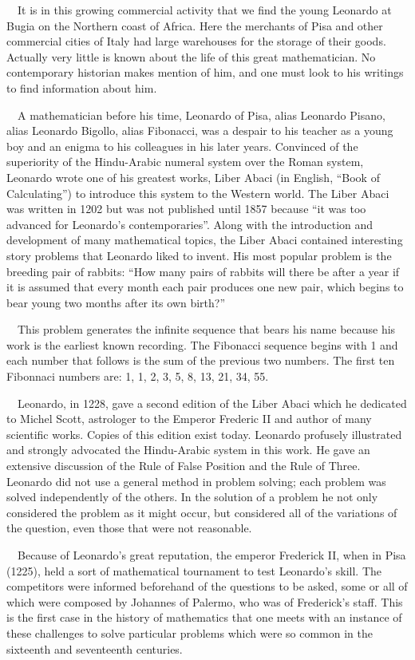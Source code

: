 \documentclass{article}
\begin{document}
\ \ It is in this growing commercial activity that we find the young Leonardo at Bugia on the Northern coast of Africa.
Here the merchants of Pisa and other commercial cities of Italy had large warehouses for the storage of their goods.
Actually very little is known about the life of this great mathematician. No contemporary historian makes mention of
him, and one must look to his writings to find information about him.

\ \ A mathematician before his time, Leonardo of Pisa, alias Leonardo Pisano, alias Leonardo Bigollo, alias Fibonacci,
was a despair to his teacher as a young boy and an enigma to his colleagues in his later years. Convinced of the
superiority of the Hindu-Arabic numeral system over the Roman system, Leonardo wrote one of his greatest works, Liber
Abaci (in English, “Book of Calculating”) to introduce this system to the Western world. The Liber Abaci was written in
1202 but was not published until 1857 because “it was too advanced for Leonardo’s contemporaries”. Along with the
introduction and development of many mathematical topics, the Liber Abaci contained interesting story problems that
Leonardo liked to invent. His most popular problem is the breeding pair of rabbits: “How many pairs of rabbits will
there be after a year if it is assumed that every month each pair produces one new pair, which begins to bear young two
months after its own birth?”

\ \ This problem generates the infinite sequence that bears his name because his work is the earliest known recording.
The Fibonacci sequence begins with 1 and each number that follows is the sum of the previous two numbers. The first ten
Fibonnaci numbers are: 1, 1, 2, 3, 5, 8, 13, 21, 34, 55.

\ \ Leonardo, in 1228, gave a second edition of the Liber Abaci which he dedicated to Michel Scott, astrologer to the
Emperor Frederic II and author of many scientific works. Copies of this edition exist today. Leonardo profusely
illustrated and strongly advocated the Hindu-Arabic system in this work. He gave an extensive discussion of the Rule of
False Position and the Rule of Three. Leonardo did not use a general method in problem solving; each problem was solved
independently of the others. In the solution of a problem he not only considered the problem as it might occur, but
considered all of the variations of the question, even those that were not reasonable. 

\ \ Because of Leonardo’s great reputation, the emperor Frederick II, when in Pisa (1225), held a sort of mathematical
tournament to test Leonardo’s skill. The competitors were informed beforehand of the questions to be asked, some or all
of which were composed by Johannes of Palermo, who was of Frederick’s staff. This is the first case in the history of
mathematics that one meets with an instance of these challenges to solve particular problems which were so common in
the sixteenth and seventeenth centuries.
\end{document}
